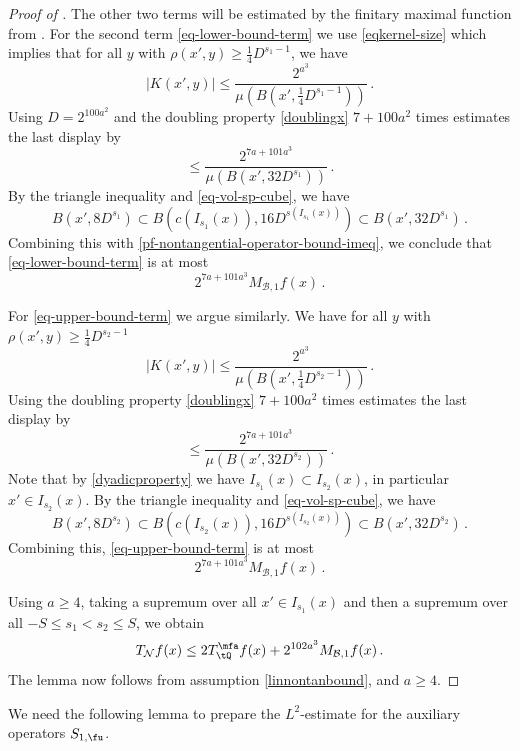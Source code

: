 \begin{proof}[Proof of ]
    The other two terms will be estimated by the finitary maximal function from .
    For the second term \eqref{eq-lower-bound-term} we use \eqref{eqkernel-size} which implies that for all $y$ with $\rho(x', y) \ge \frac{1}{4}D^{s_1 - 1}$, we have
    $$
        |K(x', y)| \le \frac{2^{a^3}}{\mu(B(x', \frac{1}{4}D^{s_1 - 1}))}\,.
    $$
    Using $D=2^{100a^2}$
    and the doubling property \eqref{doublingx} $7 +100a^2$ times estimates
    the last display by
    \begin{equation}
    \label{pf-nontangential-operator-bound-imeq}
        \le \frac{2^{7a+101a^3}}{\mu(B(x', 32D^{s_1}))}\, .
    \end{equation}
    By the triangle inequality and \eqref{eq-vol-sp-cube}, we have
    $$
        B(x', 8D^{s_1}) \subset B(c(I_{s_1}(x)), 16D^{s(I_{s_1}(x))}) \subset B(x', 32D^{s_1})\,.
    $$
    Combining this with \eqref{pf-nontangential-operator-bound-imeq}, we conclude that \eqref{eq-lower-bound-term} is at most
    $$
        2^{7a + 101a^3} M_{\mathcal{B},1} f(x)\,.
    $$

    For \eqref{eq-upper-bound-term} we argue similarly. We have for all $y$ with $\rho(x', y) \ge \frac{1}{4}D^{s_2-1}$
    $$
        |K(x', y)| \le \frac{2^{a^3}}{\mu(B(x', \frac{1}{4}D^{s_2-1}))}\,.
    $$
    Using the doubling property \eqref{doublingx} $7 + 100a^2$ times estimates
    the last display by
    \begin{equation}
        \le \frac{2^{7a + 101a^3}}{\mu(B(x', 32 D^{s_2}))}\, .
    \end{equation}
    Note that by \eqref{dyadicproperty} we have $I_{s_1}(x) \subset I_{s_2}(x)$, in particular $x' \in I_{s_2}(x)$.
    By the triangle inequality and \eqref{eq-vol-sp-cube}, we have
    $$
        B(x', 8D^{s_2}) \subset B(c(I_{s_2}(x)), 16D^{s(I_{s_2}(x))}) \subset B(x', 32D^{s_2})\,.
    $$
    Combining this, \eqref{eq-upper-bound-term} is at most
    $$
        2^{7a+101a^3} M_{\mathcal{B},1} f(x)\,.
    $$

    Using $a \ge 4$, taking a supremum over all $x' \in I_{s_1}(x)$ and then a supremum over all $-S \le s_1 < s_2 \le S$, we obtain
    $$
        T_{\mathcal{N}} f(x) \le 2T_{\tQ}^\mfa f(x) + 2^{102a^3} M_{\mathcal{B},1} f(x)\,.
    $$
    The lemma now follows from assumption \eqref{linnontanbound},  and $a \ge 4$.
\end{proof}

We need the following lemma to prepare the $L^2$-estimate for the auxiliary operators $S_{1, \fu}$.

